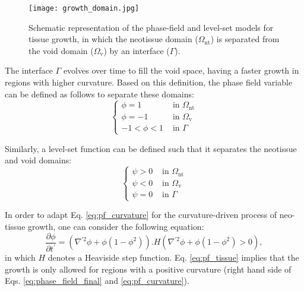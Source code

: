 \begin{figure}
\medskip
\centering
\texttt{[image: growth\_domain.jpg]}
\caption[Schematic representation of the phase-field and level-set models for tissue growth]{Schematic representation of the phase-field and level-set models for tissue growth, in which the neotissue domain ($\Omega_{\text{nt}}$) is separated from the void domain ($\Omega_{\text{v}}$) by an interface ($\Gamma$).}
\label{fig:growth_domain}
\end{figure}

The interface $\Gamma$ evolves over time to fill the void space, having a faster growth in regions with higher curvature. Based on this definition, the phase field variable can be defined as follows to separate these domains:
\begin{equation} \label{eq:pf_domains}
\left\{\begin{array}{ll}
\phi = 1 & \text{ in } \Omega_{\text{nt}} \\
\phi = -1 & \text{ in } \Omega_{\text{v}} \\
-1 < \phi < 1 & \text{ in } \Gamma
\end{array}\right.
\end{equation}

Similarly, a level-set function can be defined such that it separates the neotissue and void domains:
\begin{equation} \label{eq:ls_domains}
\left\{\begin{array}{ll}
\psi > 0 & \text{ in } \Omega_{\text{nt}} \\
\psi < 0 & \text{ in } \Omega_{\text{v}} \\
\psi = 0 & \text{ in } \Gamma
\end{array}\right.
\end{equation}

In order to adapt Eq. \ref{eq:pf_curvature} for the curvature-driven process of neo-tissue growth, one can consider the following equation:
\begin{equation} \label{eq:pf_tissue}
\frac{\partial \phi}{\partial t^{\prime}}=\left(\nabla^{\prime 2} \phi+\phi\left(1-\phi^{2}\right)\right).H\left(\nabla^{\prime 2} \phi+\phi\left(1-\phi^{2}\right)>0\right),
\end{equation}
in which $H$ denotes a Heaviside step function. Eq. \ref{eq:pf_tissue} implies that the growth is only allowed for regions with a positive curvature (right hand side of Eqs. \ref{eq:phase_field_final} and \ref{eq:pf_curvature}).

